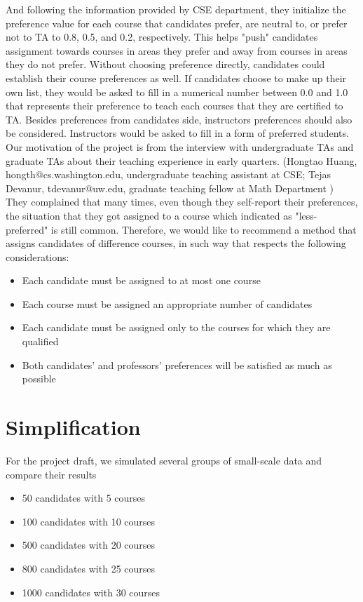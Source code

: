 \documentclass[twoside,twocolumn]{article}
\begin{document}
    And following the information provided by CSE department, they initialize the preference value for each course that candidates prefer, 
    are neutral to, or prefer not to TA to 0.8, 0.5, and 0.2, respectively. This helps "push" candidates assignment towards courses 
    in areas they prefer and away from courses in areas they do not prefer. Without choosing preference directly, candidates could establish
    their course preferences as well. If candidates choose to make up their own list, they would be asked to fill in a numerical number 
    between 0.0 and 1.0 that represents their preference to teach each courses that they are certified to TA. Besides preferences from 
    candidates side, instructors preferences should also be considered. Instructors would be asked to fill in a form of preferred students.
    \\ Our motivation of the project is from the interview with undergraduate TAs and graduate TAs about their teaching experience in early quarters.
    (Hongtao Huang, hongth@cs.washington.edu, undergraduate teaching assistant at CSE; Tejas Devanur, tdevanur@uw.edu, graduate teaching fellow at Math Department
    ) They complained that many times, even though they self-report their preferences, the situation that they got assigned to a course which 
    indicated as "less-preferred" is still common. Therefore, we would like to recommend a method that assigns candidates of difference
    courses, in such way that respects the following considerations:
    \begin{itemize}
        \item Each candidate must be assigned to at most one course
        \item Each course must be assigned an appropriate number of candidates
        \item Each candidate must be assigned only to the courses for which they are qualified
        \item Both candidates' and professors' preferences will be satisfied as much as possible
    \end{itemize}
    \section{Simplification}
    For the project draft, we simulated several groups of small-scale data and compare their results 
    \begin{itemize}
        \item 50 candidates with 5 courses
        \item 100 candidates with 10 courses
        \item 500 candidates with 20 courses
        \item 800 candidates with 25 courses
        \item 1000 candidates with 30 courses
    \end{itemize}
\end{document}
